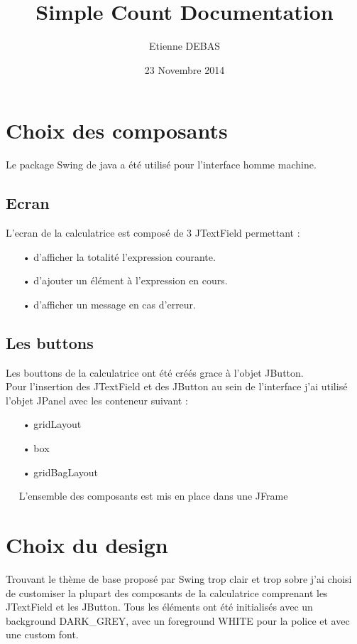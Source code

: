 \documentclass{article}
\title{Simple Count Documentation}
\author{Etienne DEBAS}
\date{23 Novembre 2014}
\begin{document}
\maketitle
\tableofcontents
\newpage
\section{Choix des composants}

	Le package Swing de java a été utilisé pour l'interface homme machine.
	
	\subsection{Ecran}	
	L'ecran de la calculatrice est composé de 3 JTextField permettant :
	\begin{itemize}
	\item[•] d'afficher la totalité l'expression courante.
	\item[•] d'ajouter un élément à l'expression en cours.
	\item[•] d'afficher un message en cas d'erreur.
	\end{itemize}
	
	\subsection{Les buttons}	
	Les bouttons de la calculatrice ont été créés grace à l'objet JButton.\\
	Pour l'insertion des JTextField et des JButton au sein de l'interface j'ai utilisé
	l'objet JPanel avec les conteneur suivant :	
	\begin{itemize}
	\item[•] gridLayout
	\item[•] box
	\item[•] gridBagLayout
	\end{itemize}

	~~\newline
	L'ensemble des composants est mis en place dans une JFrame
\section{Choix du design}
	Trouvant le thème de base proposé par Swing trop clair et trop sobre j'ai choisi de customiser
	la plupart des composants de la calculatrice comprenant les JTextField et les JButton.
	Tous les  éléments ont été initialisés avec un background DARK\_GREY, avec un foreground WHITE
	pour la police et avec une custom font.
	
\end{document}
